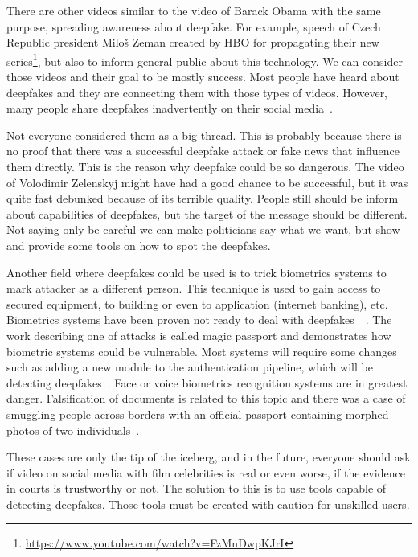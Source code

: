 There are other videos similar to the video of Barack Obama with the same purpose, spreading awareness about deepfake. For example, speech of Czech Republic president Miloš Zeman created by HBO for propagating their new series\footnote{\url{https://www.youtube.com/watch?v=FzMnDwpKJrI}}, but also to inform general public about this technology. We can consider those videos and their goal to be mostly success. Most people have heard about deepfakes and they are connecting them with those types of videos. However, many people share deepfakes inadvertently on their social media~\cite{DeepfakeSharing}.

Not everyone considered them as a big thread. This is probably because there is no proof that there was a successful deepfake attack or fake news that influence them directly. This is the reason why deepfake could be so dangerous. The video of Volodimir Zelenskyj might have had a good chance to be successful, but it was quite fast debunked because of its terrible quality. People still should be inform about capabilities of deepfakes, but the target of the message should be different. Not saying only be careful we can make politicians say what we want, but show and provide some tools on how to spot the deepfakes.

Another field where deepfakes could be used is to trick biometrics systems to mark attacker as a different person. This technique is used to gain access to secured equipment, to building or even to application (internet banking), etc. Biometrics systems have been proven not ready to deal with deepfakes~\cite{DawnOfTextDependentSociety}~\cite{TheMagicPassport}. The work describing one of attacks is called magic passport and demonstrates how biometric systems could be vulnerable. Most systems will require some changes such as adding a new module to the authentication pipeline, which will be detecting deepfakes~\cite{DigitalFaceManipulation}. Face or voice biometrics recognition systems are in greatest danger. Falsification of documents is related to this topic and there was a case of smuggling people across borders with an official passport containing morphed photos of two individuals~\cite{FaceMorphingAttackDetectionMethods}.

These cases are only the tip of the iceberg, and in the future, everyone should ask if video on social media with film celebrities is real or even worse, if the evidence in courts is trustworthy or not. The solution to this is to use tools capable of detecting deepfakes. Those tools must be created with caution for unskilled users.

